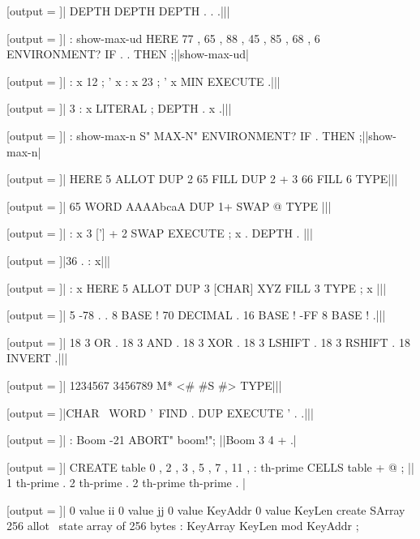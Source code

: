 [output = \result]|
  DEPTH DEPTH DEPTH . . .|||
\typeout{\result}

[output = \result]|
  : show-max-ud HERE 77 , 65 , 88 , 45 , 85 , 68 ,
    6 ENVIRONMENT? IF . . THEN ;||show-max-ud|
\typeout{\result}

[output = \result]|
  : x 12 ; ' x
  : x 23 ; ' x
  MIN EXECUTE .|||
\typeout{\result}

[output = \result]|
  3 : x LITERAL ; DEPTH . x .|||
\typeout{\result}

[output = \result]|
  : show-max-n S" MAX-N" ENVIRONMENT? IF . THEN ;||show-max-n|
\typeout{\result}

[output = \result]|
  HERE 5 ALLOT
  DUP 2 65 FILL
  DUP 2 + 3 66 FILL
  6 TYPE|||
\typeout{\result}

[output = \result]|
  65 WORD AAAAbcaA DUP 1+ SWAP @ TYPE
|||
\typeout{\result}

[output = \result]|
  : x 3 ['] + 2 SWAP EXECUTE ; x . DEPTH .
|||
\typeout{\result}

[output = \result]|36 . : x|||
\typeout{\result}

[output = \result]|
  : x HERE 5 ALLOT DUP 3 [CHAR] XYZ FILL 3 TYPE ; x |||
\typeout{\result}

[output = \result]|
  5 -78 . .
  8 BASE ! 70 DECIMAL .
  16 BASE ! -FF 8 BASE ! .|||
\typeout{\result}

[output = \result]|
  18 3 OR .
  18 3 AND .
  18 3 XOR .
  18 3 LSHIFT .
  18 3 RSHIFT .
  18 INVERT .|||
\typeout{\result}

[output = \result]|
  1234567 3456789 M* <# #S #> TYPE|||
\typeout{\result}

[output = \result]|CHAR \ WORD '\ FIND . DUP EXECUTE ' . .|||
\typeout{\result}

[output = \result]|
  : Boom -21 ABORT" boom!";
||Boom 3 4 + .|
\typeout{\result}

[output = \result]|
  CREATE table 0 , 2 , 3 , 5 , 7 , 11 ,
  : th-prime CELLS table + @ ;
||
  1 th-prime .
  2 th-prime .
  2 th-prime th-prime .
|
\typeout{\result}

\stop

[output = \result]|
  0 value ii        0 value jj
  0 value KeyAddr   0 value KeyLen
  create SArray   256 allot   \ state array of 256 bytes
  : KeyArray      KeyLen mod   KeyAddr ;

